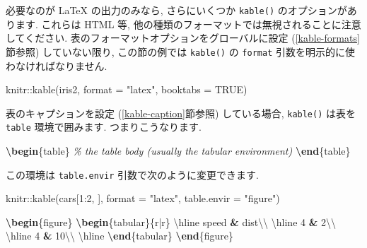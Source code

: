 \documentclass[
  11pt,
  lualatex,ja=standard,jafont=noto]{bxjsreport}
\newenvironment{Shaded}{\begin{snugshade}}{\end{snugshade}}
\newcommand{\AttributeTok}[1]{\textcolor[rgb]{0.77,0.63,0.00}{#1}}
\newcommand{\CommentTok}[1]{\textcolor[rgb]{0.56,0.35,0.01}{\textit{#1}}}
\newcommand{\ConstantTok}[1]{\textcolor[rgb]{0.00,0.00,0.00}{#1}}
\newcommand{\DecValTok}[1]{\textcolor[rgb]{0.00,0.00,0.81}{#1}}
\newcommand{\ExtensionTok}[1]{#1}
\newcommand{\FunctionTok}[1]{\textcolor[rgb]{0.00,0.00,0.00}{#1}}
\newcommand{\KeywordTok}[1]{\textcolor[rgb]{0.13,0.29,0.53}{\textbf{#1}}}
\newcommand{\NormalTok}[1]{#1}
\newcommand{\OperatorTok}[1]{\textcolor[rgb]{0.81,0.36,0.00}{\textbf{#1}}}
\newcommand{\SpecialCharTok}[1]{\textcolor[rgb]{0.00,0.00,0.00}{#1}}
\newcommand{\StringTok}[1]{\textcolor[rgb]{0.31,0.60,0.02}{#1}}
\begin{document}
必要なのが LaTeX の出力のみなら, さらにいくつか \texttt{kable()} のオプションがあります. これらは HTML 等, 他の種類のフォーマットでは無視されることに注意してください. 表のフォーマットオプションをグローバルに設定 (\ref{kable-formats}節参照) していない限り, この節の例では \texttt{kable()} の \texttt{format} 引数を明示的に使わなければなりません.

\begin{Shaded}
\begin{Highlighting}[numbers=left,,]
\NormalTok{knitr}\SpecialCharTok{::}\FunctionTok{kable}\NormalTok{(iris2, }\AttributeTok{format =} \StringTok{"latex"}\NormalTok{, }\AttributeTok{booktabs =} \ConstantTok{TRUE}\NormalTok{)}
\end{Highlighting}
\end{Shaded}

表のキャプションを設定 (\ref{kable-caption}節参照) している場合, \texttt{kable()} は表を \texttt{table} 環境で囲みます. つまりこうなります.

\begin{Shaded}
\begin{Highlighting}[]
\KeywordTok{\textbackslash{}begin}\NormalTok{\{}\ExtensionTok{table}\NormalTok{\}}
\CommentTok{\% the table body (usually the tabular environment)}
\KeywordTok{\textbackslash{}end}\NormalTok{\{}\ExtensionTok{table}\NormalTok{\}}
\end{Highlighting}
\end{Shaded}

この環境は \texttt{table.envir} 引数で次のように変更できます.

\begin{Shaded}
\begin{Highlighting}[numbers=left,,]
\NormalTok{knitr}\SpecialCharTok{::}\FunctionTok{kable}\NormalTok{(cars[}\DecValTok{1}\SpecialCharTok{:}\DecValTok{2}\NormalTok{, ], }\AttributeTok{format =} \StringTok{"latex"}\NormalTok{, }\AttributeTok{table.envir =} \StringTok{"figure"}\NormalTok{)}
\end{Highlighting}
\end{Shaded}

\begin{Shaded}
\begin{Highlighting}[]
\KeywordTok{\textbackslash{}begin}\NormalTok{\{}\ExtensionTok{figure}\NormalTok{\}}
\KeywordTok{\textbackslash{}begin}\NormalTok{\{}\ExtensionTok{tabular}\NormalTok{\}\{r|r\}}
\FunctionTok{\textbackslash{}hline}
\NormalTok{speed }\OperatorTok{\&}\NormalTok{ dist}\FunctionTok{\textbackslash{}\textbackslash{}}
\FunctionTok{\textbackslash{}hline}
\NormalTok{4 }\OperatorTok{\&}\NormalTok{ 2}\FunctionTok{\textbackslash{}\textbackslash{}}
\FunctionTok{\textbackslash{}hline}
\NormalTok{4 }\OperatorTok{\&}\NormalTok{ 10}\FunctionTok{\textbackslash{}\textbackslash{}}
\FunctionTok{\textbackslash{}hline}
\KeywordTok{\textbackslash{}end}\NormalTok{\{}\ExtensionTok{tabular}\NormalTok{\}}
\KeywordTok{\textbackslash{}end}\NormalTok{\{}\ExtensionTok{figure}\NormalTok{\}}
\end{Highlighting}
\end{Shaded}
\end{document}
